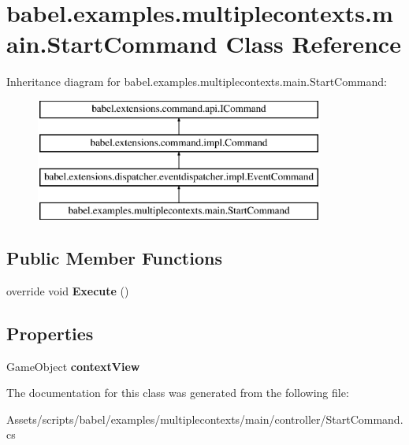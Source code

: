 \hypertarget{classbabel_1_1examples_1_1multiplecontexts_1_1main_1_1_start_command}{\section{babel.\-examples.\-multiplecontexts.\-main.\-Start\-Command Class Reference}
\label{classbabel_1_1examples_1_1multiplecontexts_1_1main_1_1_start_command}
}
Inheritance diagram for babel.\-examples.\-multiplecontexts.\-main.\-Start\-Command\-:\begin{figure}[H]
\begin{center}
\leavevmode
\includegraphics[height=4.000000cm]{classbabel_1_1examples_1_1multiplecontexts_1_1main_1_1_start_command}
\end{center}
\end{figure}
\subsection*{Public Member Functions}
\begin{DoxyCompactItemize}
\item 
\hypertarget{classbabel_1_1examples_1_1multiplecontexts_1_1main_1_1_start_command_a78566308ba6ffe7e33652cfa2da75e87}{override void {\bfseries Execute} ()}\label{classbabel_1_1examples_1_1multiplecontexts_1_1main_1_1_start_command_a78566308ba6ffe7e33652cfa2da75e87}

\end{DoxyCompactItemize}
\subsection*{Properties}
\begin{DoxyCompactItemize}
\item 
\hypertarget{classbabel_1_1examples_1_1multiplecontexts_1_1main_1_1_start_command_a95df120a359a4c5fa3e3440c98a05537}{Game\-Object {\bfseries context\-View}}\label{classbabel_1_1examples_1_1multiplecontexts_1_1main_1_1_start_command_a95df120a359a4c5fa3e3440c98a05537}

\end{DoxyCompactItemize}


The documentation for this class was generated from the following file\-:\begin{DoxyCompactItemize}
\item 
Assets/scripts/babel/examples/multiplecontexts/main/controller/Start\-Command.\-cs\end{DoxyCompactItemize}
